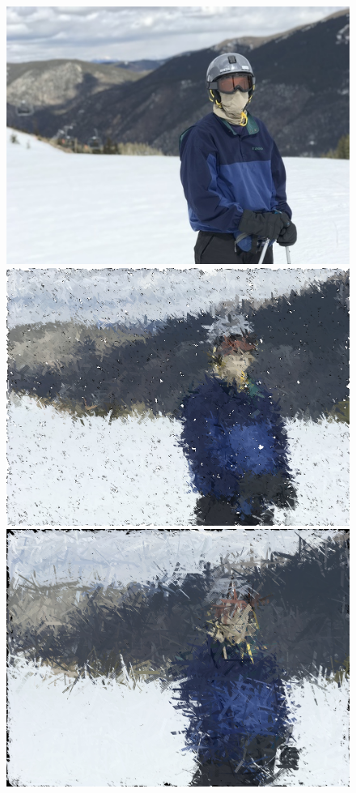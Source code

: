 \begin{figure}
    \centering
    \includegraphics[width = 0.6\linewidth]{dad_pic.jpg}
    \includegraphics[width=0.6\linewidth]{dad_pic.png}
    \includegraphics[width=0.6\linewidth]{dad_good_strokes.png}
    \label{fig:dadpics}
\end{figure}
